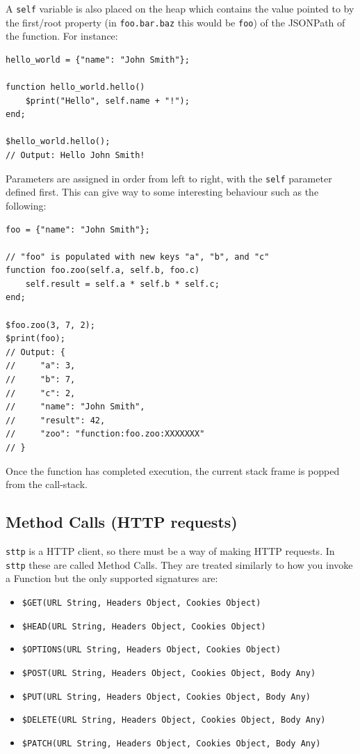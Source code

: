 \documentclass[]{full}
\theoremstyle{definition}
\begin{document}
A \verb|self| variable is also placed on the heap which contains the value pointed to by the first/root property (in \verb|foo.bar.baz| this would be \verb|foo|) of the JSONPath of the function. For instance:

\begin{verbatim}
hello_world = {"name": "John Smith"};

function hello_world.hello()
    $print("Hello", self.name + "!");
end;

$hello_world.hello();
// Output: Hello John Smith!
\end{verbatim}

Parameters are assigned in order from left to right, with the \verb|self| parameter defined first. This can give way to some interesting behaviour such as the following:

\begin{verbatim}
foo = {"name": "John Smith"};

// "foo" is populated with new keys "a", "b", and "c"
function foo.zoo(self.a, self.b, foo.c)
    self.result = self.a * self.b * self.c;
end;

$foo.zoo(3, 7, 2);
$print(foo);
// Output: {
//     "a": 3,
//     "b": 7,
//     "c": 2,
//     "name": "John Smith",
//     "result": 42,
//     "zoo": "function:foo.zoo:XXXXXXX"
// }
\end{verbatim}

Once the function has completed execution, the current stack frame is popped from the call-stack.

\subsection{Method Calls (HTTP requests)}

\verb|sttp| is a HTTP client, so there must be a way of making HTTP requests. In \verb|sttp| these are called Method Calls. They are treated similarly to how you invoke a Function but the only supported signatures are:

\begin{itemize}
    \item \verb|$GET(URL String, Headers Object, Cookies Object)|
    \item \verb|$HEAD(URL String, Headers Object, Cookies Object)|
    \item \verb|$OPTIONS(URL String, Headers Object, Cookies Object)|
    \item \verb|$POST(URL String, Headers Object, Cookies Object, Body Any)|
    \item \verb|$PUT(URL String, Headers Object, Cookies Object, Body Any)|
    \item \verb|$DELETE(URL String, Headers Object, Cookies Object, Body Any)|
    \item \verb|$PATCH(URL String, Headers Object, Cookies Object, Body Any)|
\end{itemize}
\end{document}
